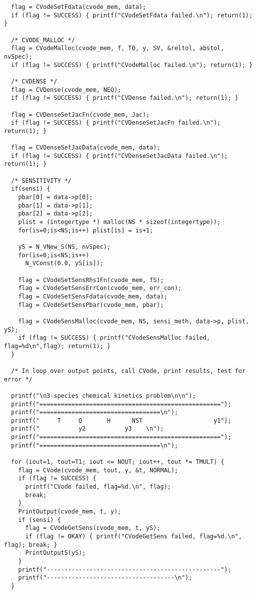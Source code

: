 \begin{verbatim}
  flag = CVodeSetFdata(cvode_mem, data);
  if (flag != SUCCESS) { printf("CVodeSetFdata failed.\n"); return(1); }

  /* CVODE_MALLOC */
  flag = CVodeMalloc(cvode_mem, f, T0, y, SV, &reltol, abstol, nvSpec);
  if (flag != SUCCESS) { printf("CVodeMalloc failed.\n"); return(1); }

  /* CVDENSE */
  flag = CVDense(cvode_mem, NEQ);
  if (flag != SUCCESS) { printf("CVDense failed.\n"); return(1); }

  flag = CVDenseSetJacFn(cvode_mem, Jac);
  if (flag != SUCCESS) { printf("CVDenseSetJacFn failed.\n"); return(1); }

  flag = CVDenseSetJacData(cvode_mem, data);
  if (flag != SUCCESS) { printf("CVDenseSetJacData failed.\n"); return(1); }

  /* SENSITIVITY */
  if(sensi) {
    pbar[0] = data->p[0];
    pbar[1] = data->p[1];
    pbar[2] = data->p[2];
    plist = (integertype *) malloc(NS * sizeof(integertype));
    for(is=0;is<NS;is++) plist[is] = is+1;

    yS = N_VNew_S(NS, nvSpec);
    for(is=0;is<NS;is++)
      N_VConst(0.0, yS[is]);

    flag = CVodeSetSensRhs1Fn(cvode_mem, fS);
    flag = CVodeSetSensErrCon(cvode_mem, err_con);
    flag = CVodeSetSensFdata(cvode_mem, data);
    flag = CVodeSetSensPbar(cvode_mem, pbar);

    flag = CVodeSensMalloc(cvode_mem, NS, sensi_meth, data->p, plist, yS);
    if (flag != SUCCESS) { printf("CVodeSensMalloc failed, flag=%d\n",flag); return(1); }
  }
  
  /* In loop over output points, call CVode, print results, test for error */

  printf("\n3-species chemical kinetics problem\n\n");
  printf("===================================================");
  printf("==================================\n");
  printf("     T     Q       H      NST                    y1");
  printf("           y2           y3    \n");
  printf("===================================================");
  printf("==================================\n");

  for (iout=1, tout=T1; iout <= NOUT; iout++, tout *= TMULT) {
    flag = CVode(cvode_mem, tout, y, &t, NORMAL);
    if (flag != SUCCESS) {
      printf("CVode failed, flag=%d.\n", flag); 
      break; 
    }
    PrintOutput(cvode_mem, t, y);
    if (sensi) {
      flag = CVodeGetSens(cvode_mem, t, yS);
      if (flag != OKAY) { printf("CVodeGetSens failed, flag=%d.\n", flag); break; }
      PrintOutputS(yS);
    } 
    printf("-------------------------------------------------");
    printf("------------------------------------\n");
  }


\end{verbatim}

